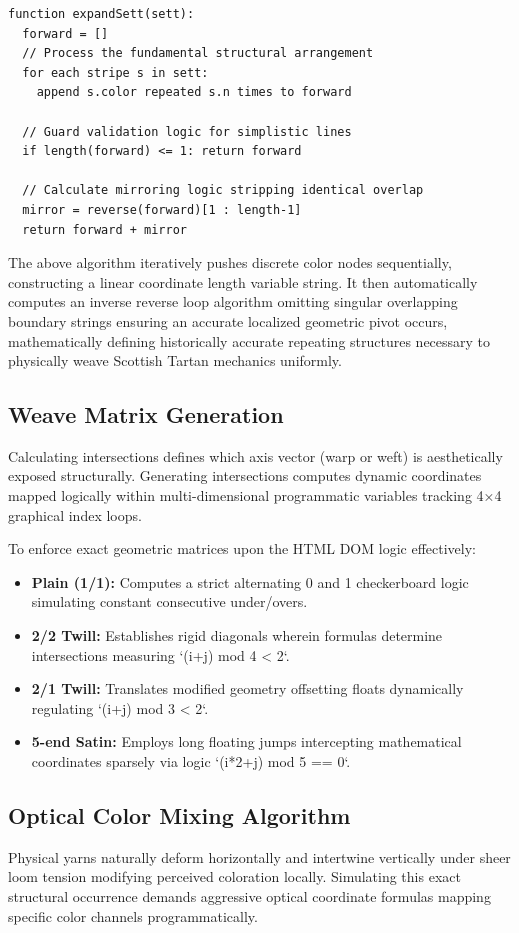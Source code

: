 \begin{verbatim}
function expandSett(sett):
  forward = []
  // Process the fundamental structural arrangement
  for each stripe s in sett:
    append s.color repeated s.n times to forward
  
  // Guard validation logic for simplistic lines
  if length(forward) <= 1: return forward
  
  // Calculate mirroring logic stripping identical overlap
  mirror = reverse(forward)[1 : length-1]
  return forward + mirror
\end{verbatim}

The above algorithm iteratively pushes discrete color nodes sequentially, constructing a linear coordinate length variable string. It then automatically computes an inverse reverse loop algorithm omitting singular overlapping boundary strings ensuring an accurate localized geometric pivot occurs, mathematically defining historically accurate repeating structures necessary to physically weave Scottish Tartan mechanics uniformly.

\subsection{Weave Matrix Generation}
Calculating intersections defines which axis vector (warp or weft) is aesthetically exposed structurally. Generating intersections computes dynamic coordinates mapped logically within multi-dimensional programmatic variables tracking 4×4 graphical index loops.

To enforce exact geometric matrices upon the HTML DOM logic effectively:
\begin{itemize}
    \item \textbf{Plain (1/1):} Computes a strict alternating 0 and 1 checkerboard logic simulating constant consecutive under/overs.
    \item \textbf{2/2 Twill:} Establishes rigid diagonals wherein formulas determine intersections measuring `(i+j) mod 4 < 2`.
    \item \textbf{2/1 Twill:} Translates modified geometry offsetting floats dynamically regulating `(i+j) mod 3 < 2`.
    \item \textbf{5-end Satin:} Employs long floating jumps intercepting mathematical coordinates sparsely via logic `(i*2+j) mod 5 == 0`.
\end{itemize}

\subsection{Optical Color Mixing Algorithm}
Physical yarns naturally deform horizontally and intertwine vertically under sheer loom tension modifying perceived coloration locally. Simulating this exact structural occurrence demands aggressive optical coordinate formulas mapping specific color channels programmatically.

